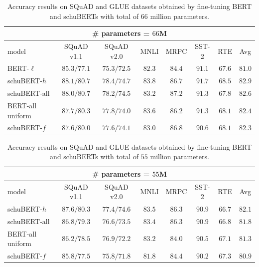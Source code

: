 \documentclass[11pt,a4paper]{article}
\begin{document}
\begin{table}[h]
\centering
\begin{tabular}{lcccccc|c}
\multicolumn{8}{c}{\# parameters = $66$M}\\
\hline
model & SQuAD v1.1 & SQuAD v2.0 & MNLI & MRPC & SST-2 & RTE & Avg\\
\hline
BERT-$\ell$ & $85.3/77.1$ &$75.3/72.5$& $82.3$ & $84.4$ & $91.1$ & $67.6$ & $81.0$\\
schuBERT-$h$ & $\pmb{88.1/80.7}$ &$\pmb{78.4/74.7}$& $\pmb{83.8}$ & $\pmb{86.7}$ & $\pmb{91.7}$ & $\pmb{68.5}$ & $\pmb{82.9}$\\
schuBERT-all & $88.0/80.7$ &$78.2/74.5$& $83.2$ & $87.2$ & $91.3$ & $67.8$ & $82.6$\\
BERT-all uniform & $87.7/80.3$ &$77.8/74.0$& $83.6$ & $86.2$ & $91.3$ & $68.1$ & $82.4$\\
schuBERT-$f$ & $87.6/80.0$ &$77.6/74.1$& $83.0$ & $86.8$ & $90.6$ & $68.1$ & $82.3$
\end{tabular}
\caption{\label{tab:results_66}Accuracy results on SQuAD and GLUE datasets obtained by fine-tuning BERT and schuBERTs with total of $66$ million parameters.
}
\end{table}

\begin{table}
\centering
\begin{tabular}{lcccccc|c}
\multicolumn{8}{c}{\# parameters = $55$M}\\
\hline
model & SQuAD v1.1 & SQuAD v2.0 & MNLI & MRPC & SST-2 & RTE & Avg\\
\hline
schuBERT-$h$ & $\pmb{87.6/80.3}$ &$\pmb{77.4/74.6}$& $\pmb{83.5}$ & $\pmb{86.3}$ & $\pmb{90.9}$ & $66.7$ & $\pmb{82.1}$\\
schuBERT-all & $86.8/79.3$ &$76.6/73.5$& $83.4$ & $86.3$ & $90.9$ & $66.8$ & $81.8$\\
BERT-all uniform & $86.2/78.5$ &$76.9/72.2$& $83.2$ & $84.0$ & $90.5$ & $67.1$ & $81.3$\\
schuBERT-$f$ & $85.8/77.5$ &$75.8/71.8$& $81.8$ & $84.4$ & $90.2$ & $\pmb{67.3}$ & $80.9$\\
\end{tabular}
\caption{\label{tab:results_55}Accuracy results on SQuAD and GLUE datasets obtained by fine-tuning BERT and schuBERTs with total of $55$ million parameters.
}
\end{table}
\end{document}
